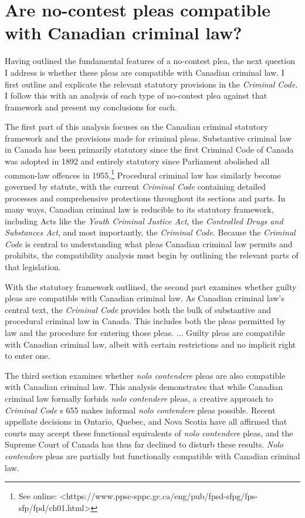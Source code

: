 \chapter{ Are no-contest pleas compatible with Canadian criminal law?}
Having outlined the fundamental features of a no-contest plea, the next question I address is whether these pleas are compatible with Canadian criminal law. I first outline and explicate the relevant statutory provisions in the \textit{Criminal Code}. I follow this with an analysis of each type of no-contest plea against that framework and present my conclusions for each.

The first part of this analysis focuses on the Canadian criminal statutory framework and the provisions made for criminal pleas. Substantive criminal law in Canada has been primarily statutory since the first Criminal Code of Canada was adopted in 1892 and entirely statutory since Parliament abolished all common-law offences in 1955.\footnote{See online: \textless https://www.ppsc-sppc.gc.ca/eng/pub/fpsd-sfpg/fps-sfp/fpd/ch01.html\textgreater} Procedural criminal law has similarly become governed by statute, with the current \textit{Criminal Code} containing detailed processes and comprehensive protections throughout its sections and parts. In many ways, Canadian criminal law is reducible to its statutory framework, including Acts like the \textit{Youth Criminal Justice Act}, the \textit{Controlled Drugs and Substances Act}, and most importantly, the \textit{Criminal Code}. Because the \textit{Criminal Code} is central to understanding what pleas Canadian criminal law permits and prohibits, the compatibility analysis must begin by outlining the relevant parts of that legislation.

With the statutory framework outlined, the second part examines whether guilty pleas are compatible with Canadian criminal law. As Canadian criminal law's central text, the \textit{Criminal Code} provides both the bulk of substantive and procedural criminal law in Canada. This includes both the pleas permitted by law and the procedure for entering those pleas.  ... Guilty pleas are compatible with Canadian criminal law, albeit with certain restrictions and no implicit right to enter one. 

The third section examines whether \textit{nolo contendere} pleas are also compatible with Canadian criminal law. This analysis demonstrates that while Canadian criminal law formally forbids \textit{nolo contendere} pleas, a creative approach to \textit{Criminal Code} s 655 makes informal \textit{nolo contendere} pleas possible. Recent appellate decisions in Ontario, Quebec, and Nova Scotia have all affirmed that courts may accept these functional equivalents of \textit{nolo contendere} pleas, and the Supreme Court of Canada has thus far declined to disturb these results. \textit{Nolo contendere} pleas are partially but functionally compatible with Canadian criminal law.

